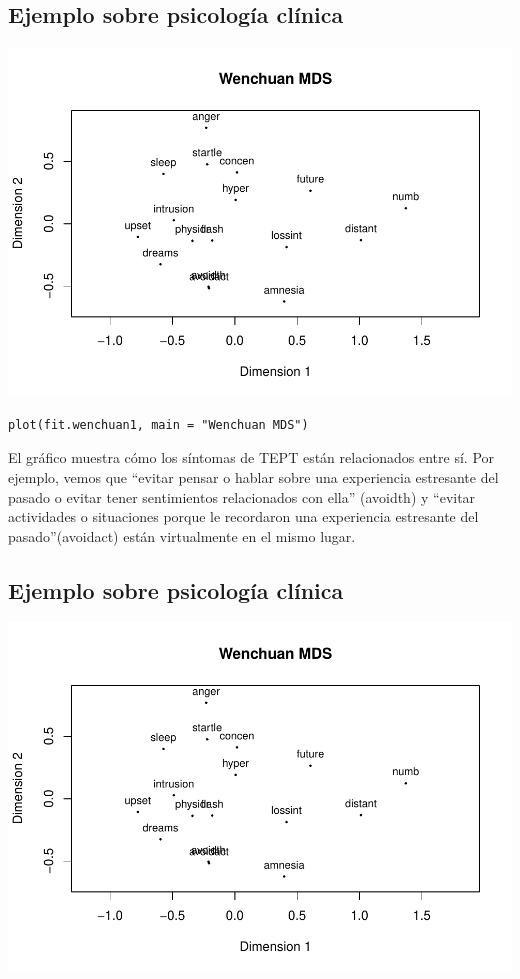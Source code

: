 \documentclass[]{article}
\begin{document}
\subsection{Ejemplo sobre psicología
clínica}\label{ejemplo-sobre-psicologuxeda-cluxednica-3}

\hypertarget{left}{}
\includegraphics{Clase-4_files/figure-latex/unnamed-chunk-29-1.pdf}

\hypertarget{right}{}
\begin{verbatim}
plot(fit.wenchuan1, main = "Wenchuan MDS")
\end{verbatim}

El gráfico muestra cómo los síntomas de TEPT están relacionados entre
sí. Por ejemplo, vemos que ``evitar pensar o hablar sobre una
experiencia estresante del pasado o evitar tener sentimientos
relacionados con ella'' (avoidth) y ``evitar actividades o situaciones
porque le recordaron una experiencia estresante del pasado''(avoidact)
están virtualmente en el mismo lugar.

\subsection{Ejemplo sobre psicología
clínica}\label{ejemplo-sobre-psicologuxeda-cluxednica-4}

\hypertarget{left}{}
\includegraphics{Clase-4_files/figure-latex/unnamed-chunk-30-1.pdf}
\end{document}
